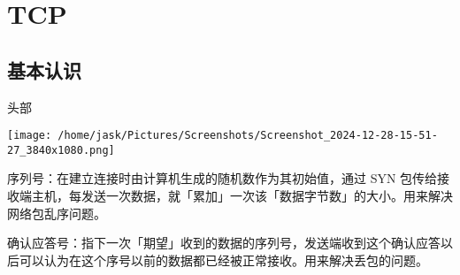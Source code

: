 \documentclass[11pt]{article}
\begin{document}
\section{TCP}
\label{sec:org8597ab0}
\subsection{基本认识}
\label{sec:org9bc46f4}
头部
\begin{center}
\texttt{[image: /home/jask/Pictures/Screenshots/Screenshot\_2024-12-28-15-51-27\_3840x1080.png]}
\end{center}
序列号：在建立连接时由计算机生成的随机数作为其初始值，通过 SYN 包传给接收端主机，每发送一次数据，就「累加」一次该「数据字节数」的大小。用来解决网络包乱序问题。

确认应答号：指下一次「期望」收到的数据的序列号，发送端收到这个确认应答以后可以认为在这个序号以前的数据都已经被正常接收。用来解决丢包的问题。
\end{document}
